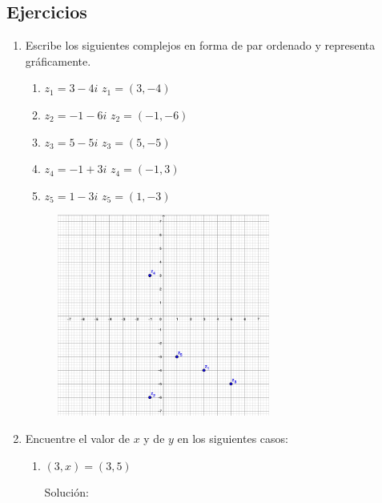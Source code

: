 \documentclass{article}
\theoremstyle{definition}
\begin{document}
    \begin{center}
        \section{Ejercicios}
    \end{center}
    \begin{enumerate}
        \item Escribe los siguientes complejos en forma de par ordenado y representa gráficamente.
        \begin{multicols}{2}
            \begin{enumerate}
                \item $z_{1} = 3 - 4i$ $z_{1} = (3, -4)$
                \item $z_{2} = -1 - 6i$ $z_{2} = (-1, -6)$
                \item $z_{3} = 5 - 5i$ $z_{3} = (5, -5)$
                \item $z_{4} = -1 + 3i$ $z_{4} = (-1, 3)$ 
                \item $z_{5} = 1 -3i$ $z_{5} = (1, -3)$
            \end{enumerate}
            \begin{figure}[H] %
                \centering
                \includegraphics[width=7cm]{Imagenes/1.png}
                \label{fig:nombre_descriptivo}
            \end{figure}
        \end{multicols}
        \item Encuentre el valor de $x$ y de $y$ en los siguientes casos: 
        \begin{enumerate}
            \item $(3, x) = (3, 5)$ 
            \begin{center}
                Solución:
            \end{center}

\end{enumerate}
\end{enumerate}
\end{document}
